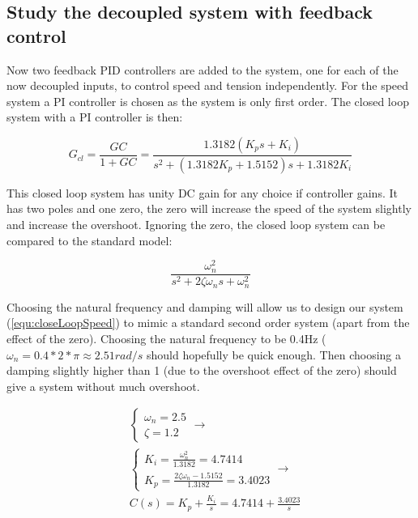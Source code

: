 \documentclass[a4paper, titlepage]{article}
\begin{document}
\subsection{Study the decoupled system with feedback control}
Now two feedback PID controllers are added to the system, one for each of the now decoupled inputs, to control speed and tension independently.
For the speed system a PI controller is chosen as the system is only first order.
The closed loop system with a PI controller is then:

\begin{equation}
G_{cl} = \frac{GC}{1 + GC} = \frac{1.3182(K_ps+K_i)}{s^2 + (1.3182K_p+1.5152)s + 1.3182K_i}
\label{equ:closeLoopSpeed}
\end{equation}

This closed loop system has unity DC gain for any choice if controller gains.
It has two poles and one zero, the zero will increase the speed of the system slightly and increase the overshoot.
Ignoring the zero, the closed loop system can be compared to the standard model:

\begin{equation}
\frac{\omega_n^2}{s^2 + 2\zeta\omega_ns + \omega_n^2}
\end{equation}

Choosing the natural frequency and damping will allow us to design our system (\ref{equ:closeLoopSpeed}) to mimic a standard second order system (apart from the effect of the zero).
Choosing the natural frequency to be 0.4Hz ($\omega_n = 0.4*2*\pi \approx 2.51rad/s$ should hopefully be quick enough.
Then choosing a damping slightly higher than 1 (due to the overshoot effect of the zero) should give a system without much overshoot.

\begin{equation}
\begin{split}
&\begin{cases}
\omega_n = 2.5 \\ \zeta = 1.2
\end{cases} \rightarrow \\
&\begin{cases}
K_i = \frac{\omega_n^2}{1.3182} = 4.7414 \\
K_p = \frac{2\zeta\omega_n - 1.5152}{1.3182} = 3.4023
\end{cases} \rightarrow \\
&C(s) = K_p + \frac{K_i}{s} = 4.7414 + \frac{3.4023}{s}
\end{split}
\end{equation}
\end{document}
